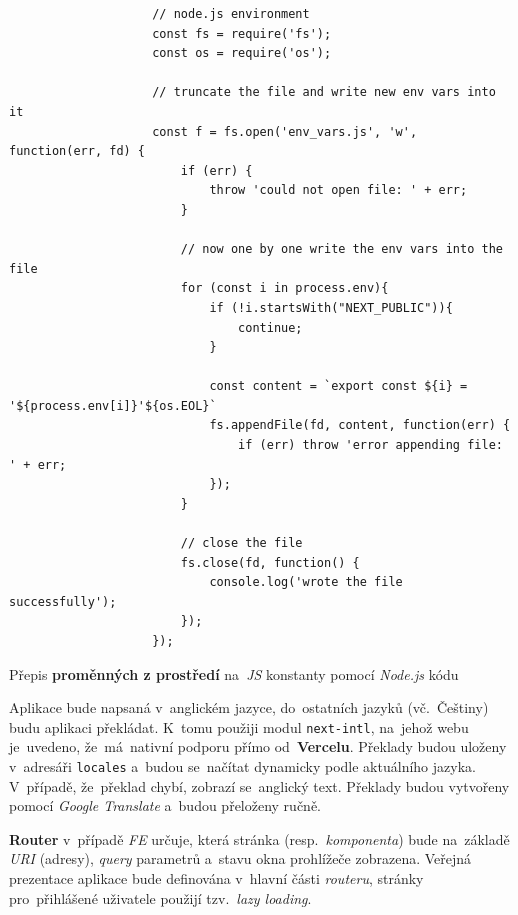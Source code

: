 \documentclass[11pt,a4paper]{report}
\let\oldacrshort\acrshort
\renewcommand{\acrshort}[1]{\emph{\normalsize\color[rgb]{0,0,0}\noindent\oldacrshort{#1}}}
\begin{document}
            \begin{code}
                \begin{verbatim}
                    // node.js environment
                    const fs = require('fs');
                    const os = require('os');
                    
                    // truncate the file and write new env vars into it
                    const f = fs.open('env_vars.js', 'w', function(err, fd) {
                        if (err) {
                            throw 'could not open file: ' + err;
                        }
                    
                        // now one by one write the env vars into the file
                        for (const i in process.env){
                            if (!i.startsWith("NEXT_PUBLIC")){
                                continue;
                            }
                    
                            const content = `export const ${i} = '${process.env[i]}'${os.EOL}`
                            fs.appendFile(fd, content, function(err) {
                                if (err) throw 'error appending file: ' + err;
                            });        
                        }
                    
                        // close the file
                        fs.close(fd, function() {
                            console.log('wrote the file successfully');
                        });
                    });
                \end{verbatim}
                \caption{Přepis \textbf{proměnných z prostředí} na~\acrshort{JS} konstanty pomocí \emph{Node.js} kódu}
                \label{js:env}
            \end{code}

            Aplikace bude napsaná v~anglickém jazyce, do~ostatních jazyků (vč.~Češtiny) budu aplikaci překládat. K~tomu použiji modul \texttt{next-intl}, na~jehož webu je~uvedeno, že~má~nativní podporu přímo od~\textbf{Vercelu}. Překlady budou uloženy v~adresáři \texttt{locales} a~budou se~načítat dynamicky podle aktuálního jazyka. V~případě, že~překlad chybí, zobrazí se~anglický text. Překlady budou vytvořeny pomocí \emph{Google Translate} a~budou přeloženy ručně.

            \textbf{Router} v~případě \acrshort{FE} určuje, která stránka (resp.~\emph{komponenta}) bude na~základě \acrshort{URI} (adresy), \emph{query} parametrů a~stavu okna prohlížeče zobrazena. Veřejná prezentace aplikace bude definována v~hlavní části \emph{routeru}, stránky pro~přihlášené uživatele použijí tzv.~\emph{lazy loading}.
\end{document}
